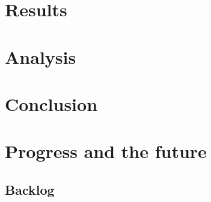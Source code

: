 \documentclass[12pt]{report}
\begin{document}
\chapter{Results}

\chapter{Analysis}

\chapter{Conclusion}

\chapter{Progress and the future}


\section{Backlog}




\end{document}
